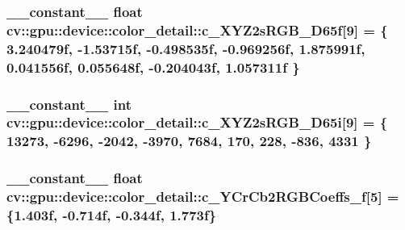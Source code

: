\hypertarget{namespacecv_1_1gpu_1_1device_1_1color__detail_a067fa5d09da16d205180ae47bedaa98b}{
\subsubsection[{c\-\_\-\-X\-Y\-Z2s\-R\-G\-B\-\_\-\-D65f}]{\setlength{\rightskip}{0pt plus 5cm}\-\_\-\-\_\-constant\-\_\-\-\_\- float cv\-::gpu\-::device\-::color\-\_\-detail\-::c\-\_\-\-X\-Y\-Z2s\-R\-G\-B\-\_\-\-D65f\mbox{[}9\mbox{]} = \{ 3.\-240479f, -\/1.\-53715f, -\/0.\-498535f, -\/0.\-969256f, 1.\-875991f, 0.\-041556f, 0.\-055648f, -\/0.\-204043f, 1.\-057311f \}}}\label{namespacecv_1_1gpu_1_1device_1_1color__detail_a067fa5d09da16d205180ae47bedaa98b}
\hypertarget{namespacecv_1_1gpu_1_1device_1_1color__detail_ae0db03981151682f94eadca3780cf813}{
\subsubsection[{c\-\_\-\-X\-Y\-Z2s\-R\-G\-B\-\_\-\-D65i}]{\setlength{\rightskip}{0pt plus 5cm}\-\_\-\-\_\-constant\-\_\-\-\_\- int cv\-::gpu\-::device\-::color\-\_\-detail\-::c\-\_\-\-X\-Y\-Z2s\-R\-G\-B\-\_\-\-D65i\mbox{[}9\mbox{]} = \{ 13273, -\/6296, -\/2042, -\/3970, 7684, 170, 228, -\/836, 4331 \}}}\label{namespacecv_1_1gpu_1_1device_1_1color__detail_ae0db03981151682f94eadca3780cf813}
\hypertarget{namespacecv_1_1gpu_1_1device_1_1color__detail_ae6f46dc891123b2b127c4af9fe8867d4}{
\subsubsection[{c\-\_\-\-Y\-Cr\-Cb2\-R\-G\-B\-Coeffs\-\_\-f}]{\setlength{\rightskip}{0pt plus 5cm}\-\_\-\-\_\-constant\-\_\-\-\_\- float cv\-::gpu\-::device\-::color\-\_\-detail\-::c\-\_\-\-Y\-Cr\-Cb2\-R\-G\-B\-Coeffs\-\_\-f\mbox{[}5\mbox{]} = \{1.\-403f, -\/0.\-714f, -\/0.\-344f, 1.\-773f\}}}\label{namespacecv_1_1gpu_1_1device_1_1color__detail_ae6f46dc891123b2b127c4af9fe8867d4}
